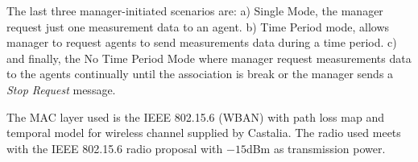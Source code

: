 The last three manager-initiated scenarios are: a) Single Mode, the manager request just one measurement data to an agent. b) Time Period mode, allows manager to request agents to send measurements data during a time period. c) and finally, the No Time Period Mode where manager request measurements data to the agents continually until the association is break or the manager sends a \textit{Stop Request} message.

The MAC layer used is the IEEE 802.15.6 (WBAN) \cite{b5} with path loss map and temporal model for wireless channel supplied by Castalia. The radio used meets with the IEEE 802.15.6 radio proposal \cite{b5} with $-15$dBm as transmission power.


